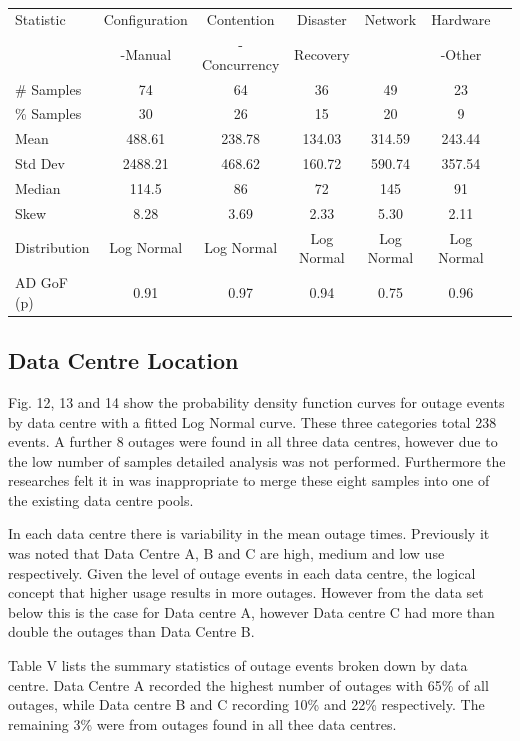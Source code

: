 \documentclass[conference]{IEEEtran}
\begin{document}
\begin {table}
\caption {}
\begin{center}
\begin{tabular}{l*{5}{c}r} Statistic & Configuration & Contention & Disaster & Network & Hardware
\\ & -Manual & -Concurrency &  Recovery & & -Other
\\ \hline \# Samples & 74 & 64 & 36 & 49 & 23
\\ \% Samples & 30 & 26 & 15 & 20 & 9
\\ Mean & 488.61 & 238.78 & 134.03 & 	314.59	& 243.44
\\ Std Dev & 2488.21	& 468.62	& 160.72	& 590.74	& 357.54
\\ Median & 114.5	& 86	& 72	& 145	& 91
\\ Skew & 8.28	& 3.69	& 2.33	& 5.30	& 2.11
\\ Distribution & Log Normal & Log Normal & Log Normal  & Log Normal & Log Normal
\\AD GoF (p) & 0.91 & 0.97 & 0.94 & 0.75 & 0.96
\end{tabular}
\end{center}
\end{table}


\subsection{Data Centre Location}

Fig. 12, 13 and 14 show the probability density function curves for outage events by data centre with a fitted Log Normal curve. These three categories total 238 events. A further 8 outages were found in all three data centres, however due to the low number of samples detailed analysis was not performed. Furthermore the researches felt it in was inappropriate to merge these eight samples into one of the existing data centre pools. \par

In each data centre there is variability in the mean outage times. Previously it was noted that Data Centre A, B and C are high, medium and low use respectively. Given the level of outage events in each data centre, the logical concept that higher usage results in more outages. However from the data set below this is the case for Data centre A, however Data centre C had more than double the outages than Data Centre B. \par

Table V lists the summary statistics of outage events broken down by data centre. Data Centre A recorded the highest number of outages with 65\% of all outages, while Data centre B and C recording 10\% and 22\% respectively. The remaining 3\% were from outages found in all thee data centres.
\end{document}
